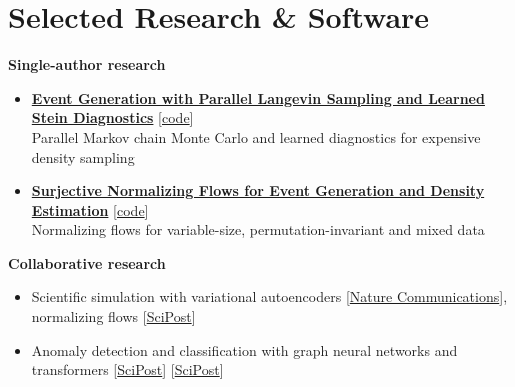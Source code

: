 \documentclass[a4paper,10pt]{article}
\begin{document}
\section{Selected Research \& Software}
\textbf{Single-author research}
\begin{itemize}[nosep,after=\strut, leftmargin=1em, itemsep=1pt]
    \item[-] \textbf{\href{https://arxiv.org/abs/2606.14854}{Event Generation with Parallel Langevin Sampling and Learned Stein Diagnostics}} [\href{https://github.com/rbvh/ula_stein_evt_gen}{code}]\\
    Parallel Markov chain Monte Carlo and learned diagnostics for expensive density sampling
    \item[-] \textbf{\href{https://scipost.org/10.21468/SciPostPhys.13.3.047}{Surjective Normalizing Flows for Event Generation and Density Estimation}} [\href{https://github.com/rbvh/surflows}{code}]\\
    Normalizing flows for variable-size, permutation-invariant and mixed data
\end{itemize}
\textbf{Collaborative research}
\begin{itemize}[nosep,after=\strut, leftmargin=1em, itemsep=1pt]
    \item[-] Scientific simulation with variational autoencoders [\href{https://www.nature.com/articles/s41467-021-22616-z}{Nature Communications}], normalizing flows [\href{https://scipost.org/10.21468/SciPostPhys.10.2.038}{SciPost}]
    \item[-] Anomaly detection and classification with graph neural networks and transformers [\href{https://scipost.org/10.21468/SciPostPhys.12.2.077}{SciPost}] [\href{https://scipost.org/10.21468/SciPostPhys.19.1.028}{SciPost}]
\end{itemize}
\end{document}
